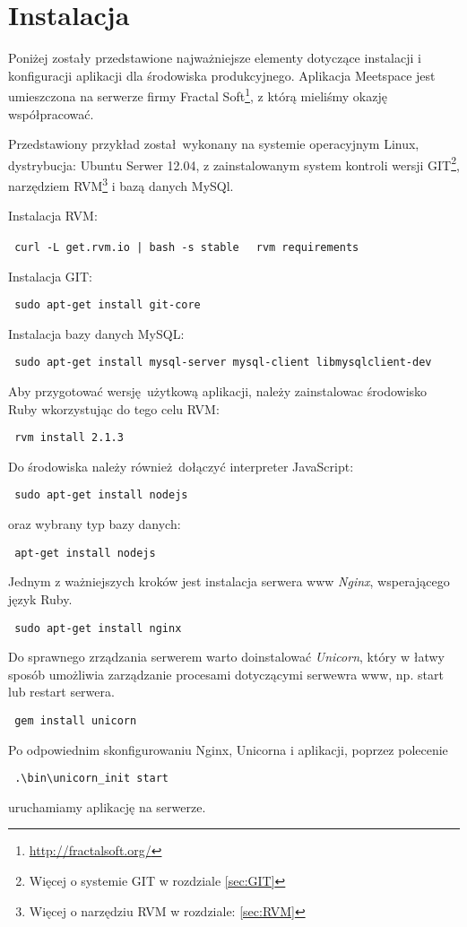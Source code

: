 \section{Instalacja}
Poniżej zostały przedstawione najważniejsze elementy dotyczące instalacji i konfiguracji aplikacji dla środowiska produkcyjnego. Aplikacja Meetspace jest umieszczona na serwerze firmy Fractal Soft\footnote{\url{http://fractalsoft.org/}}, z którą mieliśmy okazję współpracować.

Przedstawiony przykład został wykonany na systemie operacyjnym Linux, dystrybucja: Ubuntu Serwer 12.04, z zainstalowanym system kontroli wersji GIT\footnote{Więcej o systemie GIT w rozdziale \ref{sec:GIT}}, narzędziem RVM\footnote{Więcej o narzędziu RVM w rozdziale: \ref{sec:RVM}} i bazą danych MySQl.

Instalacja RVM:
\begin{center}
  \texttt{ curl -L get.rvm.io | bash -s stable }
  \texttt{ rvm requirements }
\end{center}

Instalacja GIT:
\begin{center}
  \texttt{ sudo apt-get install git-core }
\end{center}

Instalacja bazy danych MySQL:
\begin{center}
  \texttt{ sudo apt-get install mysql-server mysql-client libmysqlclient-dev }
\end{center}

Aby przygotować wersję użytkową aplikacji, należy zainstalowac środowisko Ruby wkorzystując do tego celu RVM:
\begin{center}
  \texttt{ rvm install 2.1.3 }
\end{center}
Do środowiska należy również dołączyć interpreter JavaScript:
\begin{center}
  \texttt{ sudo apt-get install nodejs }
\end{center}
oraz wybrany typ bazy danych:
\begin{center}
  \texttt{ apt-get install nodejs }
\end{center}
\clearpage
Jednym z ważniejszych kroków jest instalacja serwera www \emph{Nginx}, wsperającego język Ruby.
\begin{center}
  \texttt{ sudo apt-get install nginx }
\end{center}

Do sprawnego zrządzania serwerem warto doinstalować \emph{Unicorn}, który w łatwy sposób umożliwia zarządzanie procesami dotyczącymi serwewra www, np. start lub restart serwera.
\begin{center}
  \texttt{ gem install unicorn }
\end{center}

Po odpowiednim skonfigurowaniu Nginx, Unicorna i aplikacji, poprzez polecenie
\begin{center}
  \texttt{ .\textbackslash{bin}\textbackslash{unicorn\_init} start }
\end{center}

uruchamiamy aplikację na serwerze.
